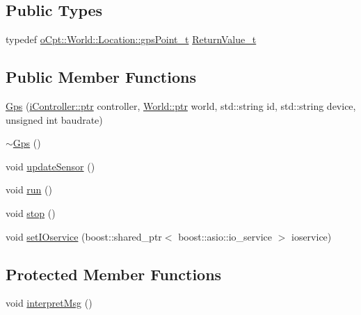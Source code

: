 \subsection*{Public Types}
\begin{DoxyCompactItemize}
\item 
typedef \hyperlink{classo_cpt_1_1_world_1_1_location_a3aa5e31e2888b4da40ad534b99473888}{o\+Cpt\+::\+World\+::\+Location\+::gps\+Point\+\_\+t} \hyperlink{classo_cpt_1_1components_1_1sensors_1_1_gps_a01613dafbb15790246b00223f850a962}{Return\+Value\+\_\+t}
\end{DoxyCompactItemize}
\subsection*{Public Member Functions}
\begin{DoxyCompactItemize}
\item 
\hyperlink{classo_cpt_1_1components_1_1sensors_1_1_gps_a24c1c7c95c57f9c5fa47d0640ba5d6dc}{Gps} (\hyperlink{classo_cpt_1_1i_controller_a6d89a95cd6ad68bb74adfaca2f36370f}{i\+Controller\+::ptr} controller, \hyperlink{classo_cpt_1_1_world_aa6e591e3096d5de71e0cec9039663d67}{World\+::ptr} world, std\+::string id, std\+::string device, unsigned int baudrate)
\item 
\hyperlink{classo_cpt_1_1components_1_1sensors_1_1_gps_aa8c7fc77c287b439f9d33bc8cfda1e68}{$\sim$\+Gps} ()
\item 
void \hyperlink{classo_cpt_1_1components_1_1sensors_1_1_gps_a95976c5d8bba650d2732d4eb43979283}{update\+Sensor} ()
\item 
void \hyperlink{classo_cpt_1_1components_1_1sensors_1_1_gps_af703c48b8b7220a1909570f46edae932}{run} ()
\item 
void \hyperlink{classo_cpt_1_1components_1_1sensors_1_1_gps_a9206c32fa91311740ae920c01eed6094}{stop} ()
\item 
void \hyperlink{classo_cpt_1_1components_1_1sensors_1_1_gps_ad613b81625402daa6fdae80022fde18c}{set\+I\+Oservice} (boost\+::shared\+\_\+ptr$<$ boost\+::asio\+::io\+\_\+service $>$ ioservice)
\end{DoxyCompactItemize}
\subsection*{Protected Member Functions}
\begin{DoxyCompactItemize}
\item 
void \hyperlink{classo_cpt_1_1components_1_1sensors_1_1_gps_a6effa9cffd5f203d84de1edce73be87a}{interpret\+Msg} ()
\end{DoxyCompactItemize}
